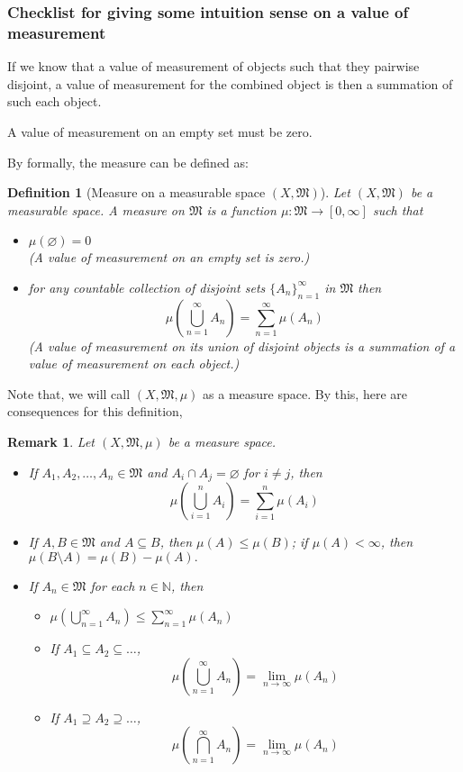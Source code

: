\documentclass[12pt, a4paper]{report}
\newtheorem{definition}[theorem]{Definition}
\newtheorem{remark}{Remark}[theorem]
\begin{document}
    \subsubsection{Checklist for giving some intuition sense on a value of measurement}
    \begin{todolist}
        \item If we know that a value of measurement of objects such that they pairwise disjoint, a value of measurement for the combined object is then a summation of such each object.
        \item A value of measurement on an empty set must be zero.
    \end{todolist}
    By formally, the measure can be defined as:
    \begin{definition}[Measure on a measurable space $(X,\mathfrak{M})$] Let $(X,\mathfrak{M})$ be a measurable space. A measure on $\mathfrak{M}$ is a function $\mu: \mathfrak{M} \to [0,\infty]$ such that
        \begin{itemize}
            \item $\mu(\varnothing) = 0$\\ (A value of measurement on an empty set is zero.)
            \item for any countable collection of disjoint sets $\{A_n\}_{n=1}^\infty$ in $\mathfrak{M}$ then
            $$\mu\left(\bigcup_{n=1}^\infty A_n\right) = \sum_{n=1}^\infty \mu(A_n)$$
            (A value of measurement on its union of disjoint objects is a summation of a value of measurement on each object.)
        \end{itemize}
    \end{definition}
    Note that, we will call $(X, \mathfrak{M}, \mu)$ as a measure space.
    By this, here are consequences for this definition,
    \begin{remark} Let $(X, \mathfrak{M}, \mu)$ be a measure space.
        \begin{itemize}
            \item If $A_1, A_2, \dots, A_n \in \mathfrak{M}$ and $A_i \cap A_j = \varnothing$ for $i \neq j$, then
            $$\mu\left(\bigcup_{i=1}^n A_i\right) = \sum_{i=1}^n \mu(A_i)$$
            \item If $A, B \in \mathfrak{M}$ and $A \subseteq B$, then $\mu(A) \leq \mu(B)$; if $\mu(A) < \infty$, then $\mu(B\setminus A) = \mu(B) - \mu(A).$
            \item If $A_n \in \mathfrak{M}$ for each $n \in \mathbb{N}$, then 
            \begin{itemize}
                \item $\displaystyle\mu\left(\bigcup_{n=1}^\infty A_n\right) \leq \sum_{n=1}^\infty \mu(A_n)$
                \item If $A_1 \subseteq A_2 \subseteq \dots$, $$\mu\left(\bigcup_{n=1}^ \infty A_n\right) = \lim_{n\to \infty} \mu(A_n)$$
                \item If $A_1 \supseteq A_2 \supseteq \dots$, $$\mu\left(\bigcap_{n=1}^ \infty A_n\right) = \lim_{n\to \infty} \mu(A_n)$$
            \end{itemize}
        \end{itemize}
    \end{remark}
\end{document}

